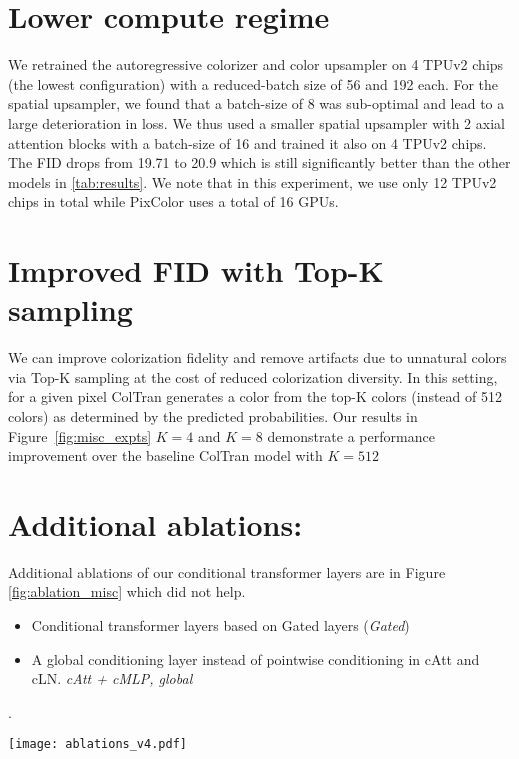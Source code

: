 \documentclass{article} \usepackage{iclr2021_conference,times}
\begin{document}
\section{Lower compute regime}

We retrained the autoregressive colorizer and color upsampler on 4 TPUv2 chips (the lowest configuration) with a reduced-batch size of 56 and 192 each.  For the spatial upsampler, we found that a batch-size of 8 was sub-optimal and lead to a large deterioration in loss. We thus used a smaller spatial upsampler with 2 axial attention blocks with a batch-size of 16 and trained it also on 4 TPUv2 chips.
The FID drops from 19.71 to 20.9 which is still significantly better than the other models in \ref{tab:results}.
We note that in this experiment, we use only 12 TPUv2 chips in total while PixColor \citep{guadarrama2017pixcolor} uses a total of 16 GPUs.

\section{Improved FID with Top-K sampling}
\label{fid:topk}
We can improve colorization fidelity and remove artifacts due to unnatural colors via Top-K sampling at the cost of reduced colorization diversity. In this setting, for a given pixel ColTran generates a color from the top-K colors (instead of 512 colors) as determined by the predicted probabilities. Our results in Figure~\ref{fig:misc_expts} $K = 4$ and $K = 8$ demonstrate a performance improvement over the baseline ColTran model with $K=512$

\section{Additional ablations:}

Additional ablations of our conditional transformer layers are in Figure \ref{fig:ablation_misc} which did not help.

\begin{itemize}
    \item Conditional transformer layers based on Gated layers \citep{oord2016pixel} (\textit{Gated})
    \item A global conditioning layer instead of pointwise conditioning in cAtt and cLN. \textit{cAtt + cMLP, global}
\end{itemize}
.

\begin{figure*}
\centering
\texttt{[image: ablations\_v4.pdf]}

\caption{Ablated models. \textit{Gated}: Gated conditioning layers as done in \citep{oord2016pixel} and \textit{cAtt + cMLP, global}: Global conditioning instead of pointwise conditioning in cAtt and cLN.}
\label{fig:ablation_misc}
\end{figure*}
\end{document}
